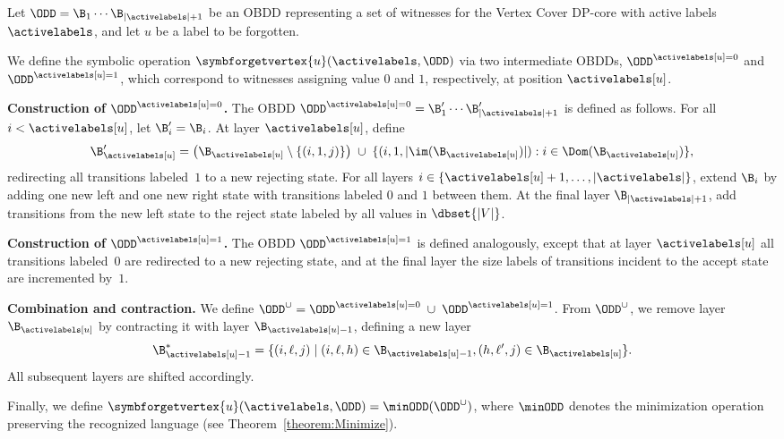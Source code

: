 Let $\ODD = \B_1 \cdots \B_{|\activelabels|+1}$ be an OBDD representing a set of
witnesses for the {\sc Vertex Cover} DP-core with active labels
$\activelabels$, and let $u$ be a label to be forgotten.

We define the symbolic operation $\symbforgetvertex{u}(\activelabels,\ODD)$ via
two intermediate OBDDs,
$\ODD^{\activelabels[u]=0}$ and $\ODD^{\activelabels[u]=1}$, which correspond to
witnesses assigning value $0$ and $1$, respectively, at position
$\activelabels[u]$.

\medskip
\noindent\textbf{Construction of $\ODD^{\activelabels[u]=0}$.}
The OBDD $\ODD^{\activelabels[u]=0} = \B'_1 \cdots \B'_{|\activelabels|+1}$ is
defined as follows.
For all $i < \activelabels[u]$, let $\B'_i = \B_i$.
At layer $\activelabels[u]$, define
\[
\B'_{\activelabels[u]}
=
\bigl(\B_{\activelabels[u]} \setminus
\{(i,1,j)\}\bigr)
\;\cup\;
\{(i,1,|\im(\B_{\activelabels[u]})|) : i \in \Dom(\B_{\activelabels[u]})\},
\]
redirecting all transitions labeled~$1$ to a new rejecting state.
For all layers $i \in \{\activelabels[u]+1,\dots,|\activelabels|\}$, extend
$\B_i$ by adding one new left and one new right state with transitions labeled
$0$ and $1$ between them.
At the final layer $\B_{|\activelabels|+1}$, add transitions from the new left
state to the reject state labeled by all values in $\dbset{|V|}$.

\medskip
\noindent\textbf{Construction of $\ODD^{\activelabels[u]=1}$.}
The OBDD $\ODD^{\activelabels[u]=1}$ is defined analogously, except that at layer
$\activelabels[u]$ all transitions labeled~$0$ are redirected to a new rejecting
state, and at the final layer the size labels of transitions incident to the
accept state are incremented by~$1$.

\medskip
\noindent\textbf{Combination and contraction.}
We define
$\ODD^\cup = \ODD^{\activelabels[u]=0} \;\cup\; \ODD^{\activelabels[u]=1}$.
From $\ODD^\cup$, we remove layer $\B_{\activelabels[u]}$ by contracting it with
layer $\B_{\activelabels[u]-1}$, defining a new layer
\[
\B^*_{\activelabels[u]-1}
=
\{(i,\ell,j) \mid
(i,\ell,h) \in \B_{\activelabels[u]-1},
(h,\ell',j) \in \B_{\activelabels[u]}\}.
\]
All subsequent layers are shifted accordingly.

Finally, we define
$\symbforgetvertex{u}(\activelabels,\ODD)
=
\minODD(\ODD^\cup)$,
where $\minODD$ denotes the minimization operation preserving the recognized
language (see Theorem~\ref{theorem:Minimize}).





